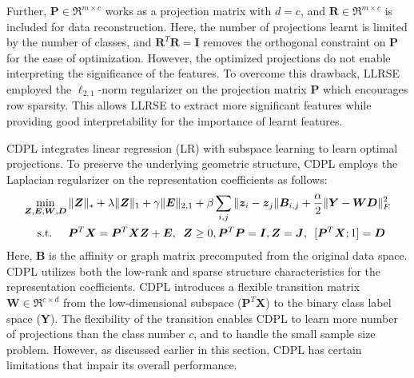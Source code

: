 Further, $\bm{P} \in \Re^{m \times c}$ works as a projection matrix with $d = c$, and $\bm{R} \in \Re^{m \times c}$ is included for data reconstruction. Here, the number of projections learnt is limited by the number of classes, and $\bm{R}^{T} \bm{R} = \bm{I}$ removes the orthogonal constraint on $\bm{P}$ for the ease of optimization. However, the optimized projections do not enable interpreting the significance of the features. To overcome this drawback, LLRSE employed the $\ell_{2,1}$-norm regularizer on the projection matrix $\bm{P}$ which encourages row sparsity. This allows LLRSE to extract more significant features while providing good interpretability for the importance of learnt features. 

CDPL integrates linear regression (LR) with subspace learning to learn optimal projections. To preserve the underlying geometric structure, CDPL employs the Laplacian regularizer on the representation coefficients as follows:
%
\begin{align}
  \begin{split}
     \label{eq: CDPL_form}
    & \underset{\bm{Z},\bm{E},\bm{W},\bm{D}}{\min} \, \| \bm{Z} \|_{*} + \lambda \|\bm{Z} \|_{1}  + \gamma \| \bm{E} \|_{2,1} + \beta \sum_{i,j} \| \bm{z}_{i} - \bm{z}_{j} \| \bm{B}_{i,j} + \frac{\alpha}{2} \| \bm{Y} - \bm{W} \bm{D} \|_{F}^{2} \\
         & \hspace{0.4cm}\text{s.t.} \hspace{0.5cm} \bm{P}^{T} \bm{X}  = \bm{P}^{T} \bm{X} \bm{Z} + \bm{E}, \enskip \bm{Z} \geq 0, \bm{P}^{T} \bm{P} = \bm{I}, \bm{Z} = \bm{J},  \enskip [\bm{P}^{T} \bm{X}; 1] = \bm{D}
    \end{split}
\end{align}
%
Here, $\bm{B}$ is the affinity or graph matrix precomputed from the original data space. CDPL utilizes both the low-rank and sparse structure characteristics for the representation coefficients. CDPL introduces a flexible transition matrix $\bm{W} \in \Re^{c \times d}$ from the low-dimensional subspace ($\bm{P}^{T} \bm{X}$) to the binary class label space ($\bm{Y}$). The flexibility of the transition enables CDPL to learn more number of projections than the class number $c$, and to handle the small sample size problem. However, as discussed earlier in this section, CDPL has certain limitations that impair its overall performance.
%

